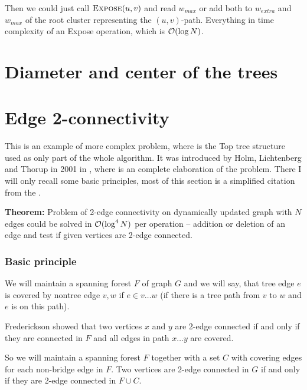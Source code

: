 Then we could just call $\hbox{\sc Expose}(u,v)$ and read $w_{max}$ or add both to
$w_{extra}$ and $w_{max}$ of the root cluster representing the $(u,v)$-path.
Everything in time complexity of an {\sc Expose} operation, which is ${\cal O}(\log
N)$.


\section{Diameter and center of the trees}


\section{Edge 2-connectivity}
\label{sec:edge_2_connectivity}

This is an example of more complex problem, where is the Top tree structure used
as only part of the whole algorithm. It was introduced by Holm, Lichtenberg and
Thorup in 2001 in \cite{PolylogarithmicAlgorithmsForConnectivity}, where is an
complete elaboration of the problem. There I will only recall some basic
principles, most of this section is a simplified citation from the
\cite{PolylogarithmicAlgorithmsForConnectivity}.

\noindent
{\bf Theorem:} Problem of 2-edge connectivity on dynamically updated graph with
$N$ edges could be solved in ${\cal O}(\log^4 N)$ per operation -- addition or
deletion of an edge and test if given vertices are 2-edge connected.

\subsubsection{Basic principle}

We will maintain a spanning forest $F$ of graph $G$ and we will say, that tree
edge $e$ is {\I covered} by nontree edge $v,w$ if $e \in v\dots w$ (if there is
a tree path from $v$ to $w$ and $e$ is on this path).

Frederickson showed that two vertices $x$ and $y$ are 2-edge connected if and
only if they are connected in $F$ and all edges in path $x\dots y$ are covered.

So we will maintain a spanning forest $F$ together with a set $C$ with covering
edges for each non-bridge edge in $F$. Two vertices are 2-edge connected in $G$
if and only if they are 2-edge connected in $F\cup C$.

